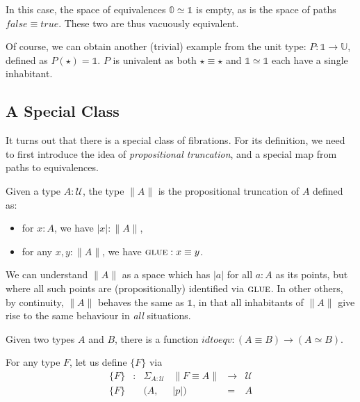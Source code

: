 \documentclass{entcs}
\newcommand{\gluep}{\textsc{glue}}
\newcommand{\fc}{\mathit{false}}
\newcommand{\tc}{\mathit{true}}
\newcommand{\bracket}[1]{\ensuremath{\{#1\}}}
\newcommand{\ptrunc}[1]{\ensuremath{\| #1 \|}}
\begin{document}
\medskip\noindent In this case, the space of equivalences
$\mathbb{0} \simeq \mathbb{1}$ is empty, as is the space of
paths $\fc \equiv \tc$. These two are thus vacuously equivalent.

Of course, we can obtain another (trivial) example from the unit type:
$P : \mathbb{1} \rightarrow \mathbb{U}$, defined as
$P(\star) = \mathbb{1}$. $P$ is univalent as both $\star \equiv \star$ and
$\mathbb{1} \simeq \mathbb{1}$ each have a single inhabitant.

\subsection{A Special Class}

It turns out that there is a special class of fibrations.  For its
definition, we need to first introduce the idea of
\emph{propositional truncation}, and a special map from
paths to equivalences.

\begin{defn}
Given a type $A : \mathcal{U}$, the type
$\ptrunc{A}$ is the propositional truncation of $A$ defined as:
\begin{itemize}
\item for $x : A$, we have $|x| : \ptrunc{A}$,
\item for any $x,y : \ptrunc{A}$, we have $\gluep : x \equiv y$.
\end{itemize}
\end{defn}
\noindent We can understand $\ptrunc{A}$ as a space which has
$|a|$ for all $a : A$ as its points, but where all such points are
(propositionally) identified via $\gluep$.  In other others,
by continuity, $\ptrunc{A}$ behaves the same as $\mathbb{1}$,
in that all inhabitants of $\ptrunc{A}$ give rise to the same
behaviour in \emph{all} situations.

\begin{defn}
Given two types $A$ and $B$, there is a function
$\mathit{idtoeqv} : (A \equiv B) \to (A \simeq B)$.
\end{defn}

For any type $F$, let us define $\bracket{F}$ via
\[\begin{array}{rcllcl}
\bracket{F} &:& \Sigma_{A:\mathcal{U}} & \ptrunc{F \equiv A} & \rightarrow & \mathcal{U} \\
\bracket{F} & & (A, & |p|) &=& A
\end{array}\]

\newpage
\end{document}

